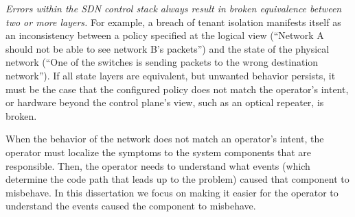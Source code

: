 \emph{Errors within the SDN control stack always result in broken equivalence between two or more layers.} For example, a breach of tenant isolation manifests itself as an inconsistency between a policy specified at the logical
view (``Network A should not be able to see network B's packets'') and the state
of the physical network (``One of the switches is sending packets to the wrong destination network'').
If all state layers are equivalent, but unwanted behavior persists, it must be the case that
the configured policy does not match the operator's intent, or hardware beyond the control plane's view, such as an optical repeater, is broken.


When the behavior of the network does not match an operator's intent, the
operator must localize the symptoms to the system components that are
responsible. Then, the operator needs to
understand what events (which determine the code path that leads up to the problem) caused that component to misbehave. In this dissertation we focus
on making it easier
for the operator to understand the events caused the component to misbehave.
